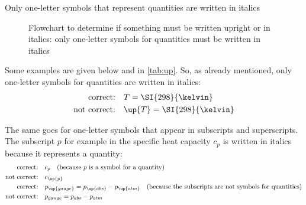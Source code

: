 \begin{frame}{Only one-letter symbols that represent quantities are written in italics}
\begin{figure}
        \caption{Flowchart to determine if something must be written upright or in italics: only one-letter symbols for quantities must be written in italics}\label{fig:italics}
    \end{figure}
\end{frame}

Some examples are given below and in \cref{tab:up}. So, as already mentioned, only one-letter symbols for quantities are written in italics:
\begin{align*}
    \text{correct:} \quad & T = \SI{298}{\kelvin} \\
    \text{not correct:} \quad & \up{T} = \SI{298}{\kelvin}
\end{align*}

The same goes for one-letter symbols that appear in subscripts and superscripts. The subscript $p$ for example in the specific heat capacity $c_{p}$ is written in italics because it represents a quantity:
\begin{align*}
    \text{correct:} \quad & c_{p} \quad \text{(because $p$ is a symbol for a quantity)} \\
    \text{not correct:} \quad & c_\up{p} \\
    \text{correct:} \quad & p_\up{gauge} = p_\up{abs} - p_\up{atm}\quad \text{(because the subscripts are not symbols for quantities)} \\
    \text{not correct:} \quad & p_{gauge} = p_{abs} - p_{atm}
\end{align*}

